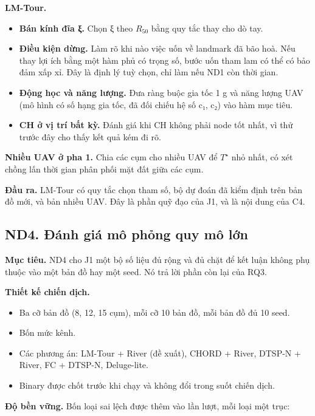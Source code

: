 \textbf{LM-Tour.}

\begin{itemize}
\tightlist
\item
  \textbf{Bán kính đĩa ξ.} Chọn ξ theo $R_{50}$ bằng quy tắc thay cho dò tay.
\item
  \textbf{Điều kiện dừng.} Làm rõ khi nào việc uốn về landmark đã bão
  hoà. Nếu thay lợi ích bằng một hàm phủ có trọng số, bước uốn tham lam
  có thể có bảo đảm xấp xỉ. Đây là định lý tuỳ chọn, chỉ làm nếu ND1 còn
  thời gian.
\item
  \textbf{Động học và năng lượng.} Đưa ràng buộc gia tốc 1 g và năng
  lượng UAV (mô hình có số hạng gia tốc, đã đối chiếu hệ số c₁, c₂) vào
  hàm mục tiêu.
\item
  \textbf{CH ở vị trí bất kỳ.} Đánh giá khi CH không phải node tốt nhất,
  vì thử trước đây cho thấy kết quả kém đi rõ.
\end{itemize}

\textbf{Nhiều UAV ở pha 1.} Chia các cụm cho nhiều UAV để $T^\star$ nhỏ nhất,
có xét chồng lấn thời gian phân phối mặt đất giữa các cụm.

\textbf{Đầu ra.} LM-Tour có quy tắc chọn tham số, bộ dự đoán đã kiểm
định trên bản đồ mới, và bản nhiều UAV. Đây là phần quỹ đạo của J1, và
là nội dung của C4.

\subsection{ND4. Đánh giá mô phỏng quy mô lớn}

\textbf{Mục tiêu.} ND4 cho J1 một bộ số liệu đủ rộng và đủ chặt để kết
luận không phụ thuộc vào một bản đồ hay một seed. Nó trả lời phần còn
lại của RQ3.

\textbf{Thiết kế chiến dịch.}

\begin{itemize}
\tightlist
\item
  Ba cỡ bản đồ (8, 12, 15 cụm), mỗi cỡ 10 bản đồ, mỗi bản đồ đủ 10 seed.
\item
  Bốn mức kênh.
\item
  Các phương án: LM-Tour + River (đề xuất), CHORD + River, DTSP-N +
  River, FC + DTSP-N, Deluge-lite.
\item
  Binary được chốt trước khi chạy và không đổi trong suốt chiến dịch.
\end{itemize}

\textbf{Độ bền vững.} Bốn loại sai lệch được thêm vào lần lượt, mỗi loại
một trục:

